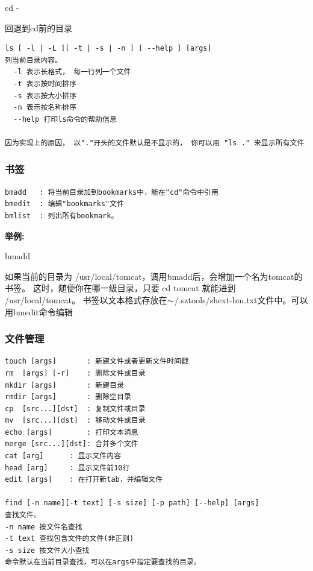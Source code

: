 \documentclass[oneside,openany]{book}
\begin{document}
\begin{mdframed}[style=SmallFrame] cd - \end{mdframed}回退到cd前的目录
\vspace{4mm}

\begin{verbatim}
ls [ -l | -L ][ -t | -s | -n ] [ --help ] [args] 
列当前目录内容。 
  -l 表示长格式， 每一行列一个文件
  -t 表示按时间排序
  -s 表示按大小排序
  -n 表示按名称排序
  --help 打印ls命令的帮助信息

因为实现上的原因， 以"."开头的文件默认是不显示的， 你可以用 "ls ." 来显示所有文件
\end{verbatim}

\subsubsection{书签}
\begin{verbatim}
bmadd   : 将当前目录加到bookmarks中，能在"cd"命令中引用
bmedit  : 编辑"bookmarks"文件
bmlist  : 列出所有bookmark。
\end{verbatim}

\begin{flushleft}\textbf{举例:}\end{flushleft}
\begin{mdframed}[style=SmallFrame] bmadd \end{mdframed}
如果当前的目录为 /usr/local/tomcat，调用bmadd后，会增加一个名为tomcat的书签。
这时，随便你在哪一级目录，只要 cd tomcat 就能进到 /usr/local/tomcat。
书签以文本格式存放在$\tiny{\sim}$/.sztools/shext-bm.txt文件中。可以用bmedit命令编辑
\vspace{4mm}

\subsubsection{文件管理}
\begin{verbatim}
touch [args]       : 新建文件或者更新文件时间戳
rm  [args] [-r]    : 删除文件或目录
mkdir [args]       : 新建目录
rmdir [args]       : 删除空目录
cp  [src...][dst]  : 复制文件或目录
mv  [src...][dst]  : 移动文件或目录
echo [args]        : 打印文本消息
merge [src...][dst]: 合并多个文件
cat [arg]      : 显示文件内容
head [arg]     : 显示文件前10行
edit [args]    : 在打开新tab，并编辑文件

find [-n name][-t text] [-s size] [-p path] [--help] [args] 
查找文件。
-n name 按文件名查找
-t text 查找包含文件的文件(非正则)
-s size 按文件大小查找
命令默认在当前目录查找，可以在args中指定要查找的目录。
\end{verbatim}
\end{document}
